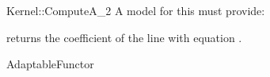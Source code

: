 \begin{ccRefFunctionObjectConcept}{Kernel::ComputeA_2}
A model for this must provide:


       {returns the coefficient  of the line with equation .}

\ccRefines
AdaptableFunctor



\end{ccRefFunctionObjectConcept}
